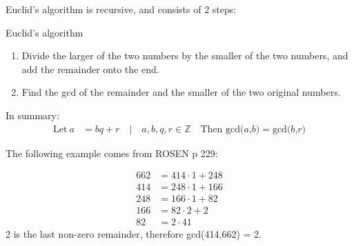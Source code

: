Euclid's algorithm is recursive, and consists of $2$ steps:
\begin{remember}{Euclid's algorithm}{
\begin{enumerate}
  \item Divide the larger of the two numbers by the smaller of the two numbers,
  and add the remainder onto the end.
  \item Find the gcd of the remainder and the smaller of the two original numbers.
\end{enumerate}

In summary:
\begin{align}
  \text{Let} ~ a &= bq + r \quad | \quad a,b,q,r \in \mathbb{Z} \quad \text{Then gcd($a$,$b$)} = \text{gcd($b$,$r$)}
\end{align}
}
\end{remember}

The following example comes from ROSEN p 229:

\begin{align}
  662 &= 414 \cdot 1 + 248 \\
  414 &= 248 \cdot 1 + 166 \\
  248 &= 166 \cdot 1 + 82 \\
  166 &= 82 \cdot 2 + 2 \\
  82 &= 2 \cdot 41
\end{align}
2 is the last non-zero remainder, therefore gcd(414,662) = 2.